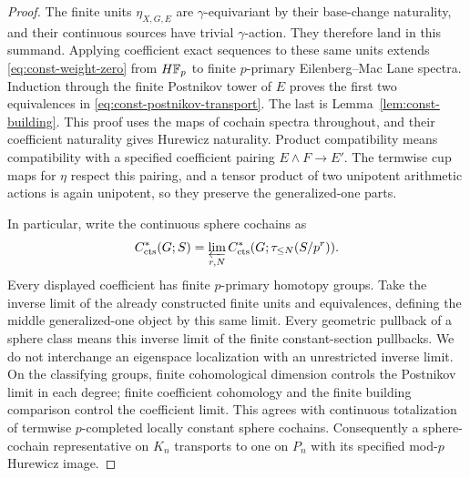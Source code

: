 \begin{proof}
The finite units $\eta_{X,G,E}$ are $\gamma$-equivariant by their
base-change naturality, and their continuous sources have trivial
$\gamma$-action.  They therefore land in this summand.  Applying
coefficient exact sequences to these same units extends
\eqref{eq:const-weight-zero} from $H\mathbb F_p$ to finite $p$-primary
Eilenberg--Mac Lane spectra.  Induction through the finite Postnikov
tower of $E$ proves the first two equivalences in
\eqref{eq:const-postnikov-transport}.  The last is
Lemma~\ref{lem:const-building}.  This proof uses the maps of cochain
spectra throughout, and their coefficient naturality gives Hurewicz
naturality.  Product compatibility means compatibility with a specified
coefficient pairing $E\wedge F\to E'$.  The termwise cup maps for
$\eta$ respect this pairing, and a tensor product of two unipotent
arithmetic actions is again unipotent, so they preserve the
generalized-one parts.

In particular, write the continuous sphere cochains as
\begin{equation}
 C^*_{\mathrm{cts}}(G;S)
   =\varprojlim_{r,N}
      C^*_{\mathrm{cts}}
          (G;\tau_{\leq N}(S/p^r)).
 \label{eq:const-sphere-cochains}
\end{equation}
Every displayed coefficient has finite $p$-primary homotopy groups.
Take the inverse limit of the already constructed finite units and
equivalences, defining the middle generalized-one object by this same
limit.  Every geometric pullback of a sphere class means this inverse
limit of the finite constant-section pullbacks.  We do not interchange
an eigenspace localization with an unrestricted inverse limit.  On the
classifying groups, finite cohomological
dimension controls the Postnikov limit in each degree; finite
coefficient cohomology and the finite building comparison control the
coefficient limit.  This agrees with continuous totalization of
termwise $p$-completed locally constant sphere cochains.  Consequently
a sphere-cochain representative on $K_n$ transports to one on $P_n$
with its specified mod-$p$ Hurewicz image.


\end{proof}
